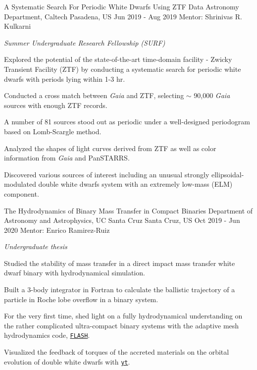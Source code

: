 \begin{cvexperiences}
\cvexperience
{A Systematic Search For Periodic White Dwarfs Using ZTF Data} %
{Astronomy Department, Caltech} %
{Pasadena, US} %
{Jun 2019 - Aug 2019} %
{Mentor: Shrinivas R. Kulkarni}
{ %
	\begin{cvitems}
		\item {\textit{Summer Undergraduate Research Fellowship (SURF)}}
		\item {Explored the potential of the state-of-the-art time-domain facility - Zwicky Transient Facility (ZTF) by conducting a systematic search for periodic white dwarfs with periods lying within 1-3 hr.}
		\item {Conducted a cross match between \textit{Gaia} and ZTF, selecting $\sim$ 90,000 \textit{Gaia} sources with enough ZTF records.}
		\item {A number of 81 sources stood out as periodic under a well-designed periodogram based on Lomb-Scargle method.}
		\item {Analyzed the shapes of light curves derived from ZTF as well as color information from \textit{Gaia} and PanSTARRS.}
		\item {Discovered various sources of interest including an unusual strongly ellipsoidal-modulated double white dwarfs system with an extremely low-mass (ELM) component.}
	\end{cvitems}
}

\cvexperience
{The Hydrodynamics of Binary Mass Transfer in Compact Binaries} %
{Department of Astronomy and Astrophysics, UC Santa Cruz} %
{Santa Cruz, US} %
{Oct 2019 - Jun 2020} %
{Mentor: Enrico Ramirez-Ruiz}
{ %
	\begin{cvitems}
		\item {\textit{Undergraduate thesis}}
		\item {Studied the stability of mass transfer in a direct impact mass transfer white dwarf binary with hydrodynamical simulation.}
		\item {Built a 3-body integrator in Fortran to calculate the ballistic trajectory of a particle in Roche lobe overflow in a binary system.}
		\item {For the very first time, shed light on a fully hydrodynamical understanding on the rather complicated ultra-compact binary systems with the adaptive mesh hydrodynamics code, \href{http://flash.uchicago.edu/site/}{\texttt{FLASH}}.}
		\item {Visualized the feedback of torques of the accreted materials on the orbital evolution of double white dwarfs with \href{https://yt-project.org}{\texttt{yt}}.}
	\end{cvitems}
}

\end{cvexperiences}